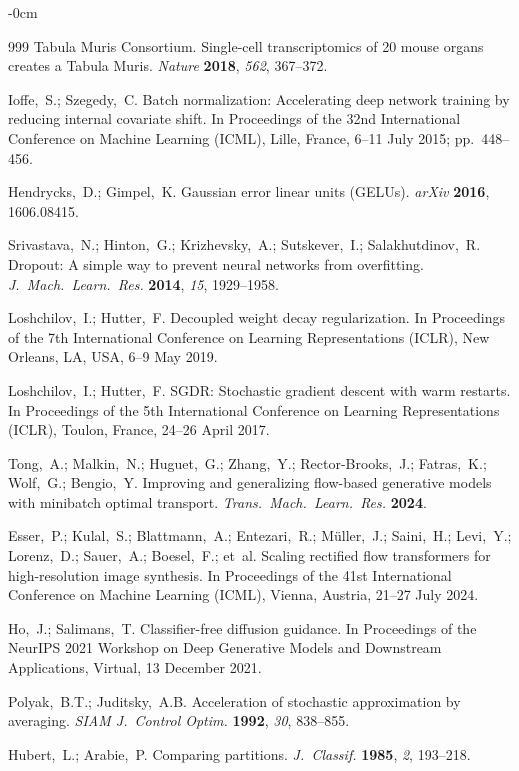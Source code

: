 \documentclass[biology,article,submit,pdftex,moreauthors]{Definitions/mdpi}
\begin{document}
\begin{adjustwidth}{-\extralength}{0cm}
\begin{thebibliography}{999}
Tabula Muris Consortium. Single-cell transcriptomics of 20 mouse organs creates a Tabula Muris. {\em Nature} {\bf 2018}, {\em 562}, 367--372.

Ioffe,~S.; Szegedy,~C. Batch normalization: Accelerating deep network training by reducing internal covariate shift. In Proceedings of the 32nd International Conference on Machine Learning (ICML), Lille, France, 6--11 July 2015; pp.\ 448--456.

Hendrycks,~D.; Gimpel,~K. Gaussian error linear units (GELUs). {\em arXiv} {\bf 2016}, 1606.08415.

Srivastava,~N.; Hinton,~G.; Krizhevsky,~A.; Sutskever,~I.; Salakhutdinov,~R. Dropout: A simple way to prevent neural networks from overfitting. {\em J.\ Mach.\ Learn.\ Res.} {\bf 2014}, {\em 15}, 1929--1958.

Loshchilov,~I.; Hutter,~F. Decoupled weight decay regularization. In Proceedings of the 7th International Conference on Learning Representations (ICLR), New Orleans, LA, USA, 6--9 May 2019.

Loshchilov,~I.; Hutter,~F. SGDR: Stochastic gradient descent with warm restarts. In Proceedings of the 5th International Conference on Learning Representations (ICLR), Toulon, France, 24--26 April 2017.

Tong,~A.; Malkin,~N.; Huguet,~G.; Zhang,~Y.; Rector-Brooks,~J.; Fatras,~K.; Wolf,~G.; Bengio,~Y. Improving and generalizing flow-based generative models with minibatch optimal transport. {\em Trans.\ Mach.\ Learn.\ Res.} {\bf 2024}.

Esser,~P.; Kulal,~S.; Blattmann,~A.; Entezari,~R.; M\"{u}ller,~J.; Saini,~H.; Levi,~Y.; Lorenz,~D.; Sauer,~A.; Boesel,~F.; et~al. Scaling rectified flow transformers for high-resolution image synthesis. In Proceedings of the 41st International Conference on Machine Learning (ICML), Vienna, Austria, 21--27 July 2024.

Ho,~J.; Salimans,~T. Classifier-free diffusion guidance. In Proceedings of the NeurIPS 2021 Workshop on Deep Generative Models and Downstream Applications, Virtual, 13 December 2021.

Polyak,~B.T.; Juditsky,~A.B. Acceleration of stochastic approximation by averaging. {\em SIAM J.\ Control Optim.} {\bf 1992}, {\em 30}, 838--855.

Hubert,~L.; Arabie,~P. Comparing partitions. {\em J.\ Classif.} {\bf 1985}, {\em 2}, 193--218.


\end{thebibliography}
\end{adjustwidth}
\end{document}
